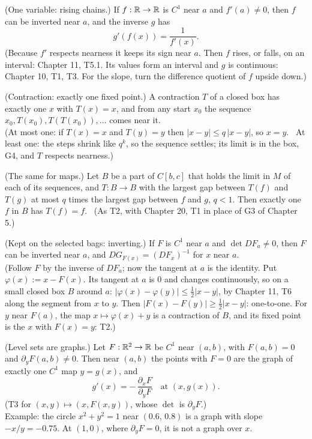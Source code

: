 \begin{lines}
\item[\lab{T1}] (One variable: rising chains.) If $f : \mathbb{R} \to \mathbb{R}$ is $C^1$ near $a$ and $f'(a) \neq 0$, then $f$ can be inverted near $a$, and the inverse $g$ has
\[
g'(f(x)) = \frac{1}{f'(x)} .
\]
(Because $f'$ respects nearness it keeps its sign near $a$. Then $f$ rises, or falls, on an interval: Chapter 11, T5.1. Its values form an interval and $g$ is continuous: Chapter 10, T1, T3. For the slope, turn the difference quotient of $f$ upside down.)
\item[\lab{T2}] (Contraction: exactly one fixed point.) A contraction $T$ of a closed box has exactly one $x$ with $T(x) = x$, and from any start $x_0$ the sequence $x_0, T(x_0), T(T(x_0)), \dots$ comes near it. \\
(At most one: if $T(x) = x$ and $T(y) = y$ then $|x - y| \le q\,|x - y|$, so $x = y$. \ At least one: the steps shrink like $q^k$, so the sequence settles; its limit is in the box, G4, and $T$ respects nearness.)
\item[\lab{T2.1}] (The same for maps.) Let $B$ be a part of $C[b,c]$ that holds the limit in $M$ of each of its sequences, and $T : B \to B$ with the largest gap between $T(f)$ and $T(g)$ at most $q$ times the largest gap between $f$ and $g$, $q < 1$. Then exactly one $f$ in $B$ has $T(f) = f$. \ (As T2, with Chapter 20, T1 in place of G3 of Chapter 5.)
\item[\lab{T3}] (Kept on the selected bags: inverting.) If $F$ is $C^1$ near $a$ and $\det DF_a \neq 0$, then $F$ can be inverted near $a$, and $DG_{F(x)} = (DF_x)^{-1}$ for $x$ near $a$. \\
(Follow $F$ by the inverse of $DF_a$; now the tangent at $a$ is the identity. Put $\varphi(x) := x - F(x)$. Its tangent at $a$ is $0$ and changes continuously, so on a small closed box $B$ around $a$: $|\varphi(x) - \varphi(y)| \le \tfrac12 |x - y|$, by Chapter 11, T6 along the segment from $x$ to $y$. Then $|F(x) - F(y)| \ge \tfrac12 |x - y|$: one-to-one. For $y$ near $F(a)$, the map $x \mapsto \varphi(x) + y$ is a contraction of $B$, and its fixed point is the $x$ with $F(x) = y$: T2.)
\item[\lab{T4}] (Level sets are graphs.) Let $F : \mathbb{R}^2 \to \mathbb{R}$ be $C^1$ near $(a, b)$, with $F(a, b) = 0$ and $\partial_y F(a, b) \neq 0$. Then near $(a, b)$ the points with $F = 0$ are the graph of exactly one $C^1$ map $y = g(x)$, and
\[
g'(x) = -\,\frac{\partial_x F}{\partial_y F} \quad\text{at } (x, g(x)).
\]
(T3 for $(x, y) \mapsto (x, F(x, y))$, whose $\det$ is $\partial_y F$.) \\
Example: the circle $x^2 + y^2 = 1$ near $(0.6,\, 0.8)$ is a graph with slope $-x/y = -0.75$. At $(1, 0)$, where $\partial_y F = 0$, it is not a graph over $x$.
\end{lines}

